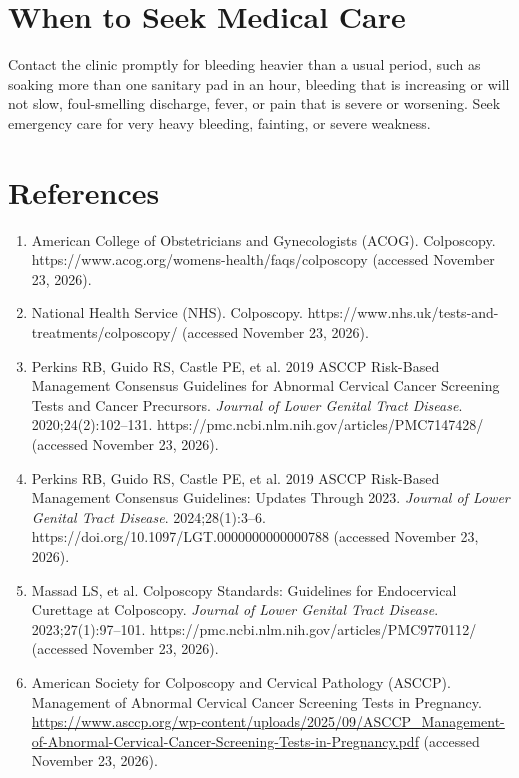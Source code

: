 \section*{When to Seek Medical Care}
Contact the clinic promptly for bleeding heavier than a usual period, such as soaking more than one sanitary pad in an hour, bleeding that is increasing or will not slow, foul-smelling discharge, fever, or pain that is severe or worsening. Seek emergency care for very heavy bleeding, fainting, or severe weakness.

\section*{References}
\begin{enumerate}
  \item American College of Obstetricians and Gynecologists (ACOG). Colposcopy. https://www.acog.org/womens-health/faqs/colposcopy (accessed November 23, 2026).
  \item National Health Service (NHS). Colposcopy. https://www.nhs.uk/tests-and-treatments/colposcopy/ (accessed November 23, 2026).
  \item Perkins RB, Guido RS, Castle PE, et al. 2019 ASCCP Risk-Based Management Consensus Guidelines for Abnormal Cervical Cancer Screening Tests and Cancer Precursors. \textit{Journal of Lower Genital Tract Disease}. 2020;24(2):102--131. https://pmc.ncbi.nlm.nih.gov/articles/PMC7147428/ (accessed November 23, 2026).
  \item Perkins RB, Guido RS, Castle PE, et al. 2019 ASCCP Risk-Based Management Consensus Guidelines: Updates Through 2023. \textit{Journal of Lower Genital Tract Disease}. 2024;28(1):3--6. https://doi.org/10.1097/LGT.0000000000000788 (accessed November 23, 2026).
  \item Massad LS, et al. Colposcopy Standards: Guidelines for Endocervical Curettage at Colposcopy. \textit{Journal of Lower Genital Tract Disease}. 2023;27(1):97--101. https://pmc.ncbi.nlm.nih.gov/articles/PMC9770112/ (accessed November 23, 2026).
  \item American Society for Colposcopy and Cervical Pathology (ASCCP). Management of Abnormal Cervical Cancer Screening Tests in Pregnancy. \url{https://www.asccp.org/wp-content/uploads/2025/09/ASCCP_Management-of-Abnormal-Cervical-Cancer-Screening-Tests-in-Pregnancy.pdf} (accessed November 23, 2026).
\end{enumerate}

\clearpage

